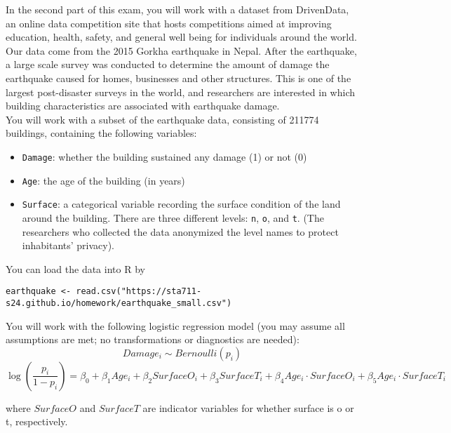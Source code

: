 \documentclass[11pt]{article}
\begin{document}
In the second part of this exam, you will work with a dataset from DrivenData, an online data competition site that hosts competitions aimed at improving education, health, safety, and general well being for individuals around the world.\\

\noindent Our data come from the 2015 Gorkha earthquake in Nepal. After the earthquake, a large scale survey was conducted to determine the amount of damage the earthquake caused for homes, businesses and other structures. This is one of the largest post-disaster surveys in the world, and researchers are interested in which building characteristics are associated with earthquake damage.\\

\noindent You will work with a subset of the earthquake data, consisting of 211774 buildings, containing the following variables:
\begin{itemize}
\item \verb;Damage;: whether the building sustained any damage (1) or not (0)

\item \verb;Age;: the age of the building (in years)

\item \verb;Surface;: a categorical variable recording the surface condition of the land around the building. There are three different levels: \verb;n;, \verb;o;, and \verb;t;. (The researchers who collected the data anonymized the level names to protect inhabitants' privacy).
\end{itemize}

\noindent You can load the data into R by
\begin{verbatim}
earthquake <- read.csv("https://sta711-s24.github.io/homework/earthquake_small.csv")
\end{verbatim}

\noindent You will work with the following logistic regression model (you may assume all assumptions are met; no transformations or diagnostics are needed):
$$Damage_i \sim Bernoulli(p_i)$$
$$\log \left( \dfrac{p_i}{1 - p_i} \right) = \beta_0 + \beta_1 Age_i + \beta_2 SurfaceO_i + \beta_3 SurfaceT_i + \beta_4 Age_i \cdot SurfaceO_i + \beta_5 Age_i \cdot SurfaceT_i$$

where $SurfaceO$ and $SurfaceT$ are indicator variables for whether surface is o or t, respectively.\\
\end{document}
